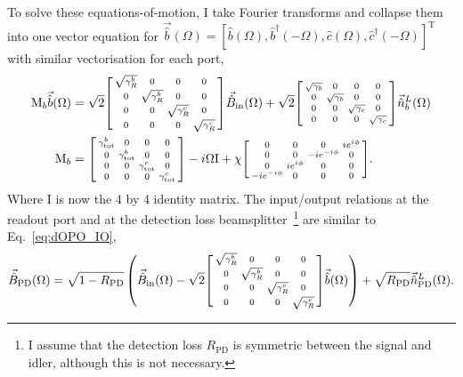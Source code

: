 To solve these equations-of-motion, I take Fourier transforms and collapse them into one vector equation for $\vec{\hat b}(\Omega)=[\hat b(\Omega), \hat b^\dag(-\Omega), \hat c(\Omega), \hat c^\dag(-\Omega)]^\text{T}$ with similar vectorisation for each port,
\begin{align}
\text{M}_b\vec{\hat b}(\Omega)&=\sqrt{2}\begin{bsmallmatrix}
\sqrt{\gamma^b_R} & 0 & 0 & 0 \\
0 & \sqrt{\gamma^b_R} & 0 & 0 \\
0 & 0 & \sqrt{\gamma^c_R} & 0 \\
0 & 0 & 0 & \sqrt{\gamma^c_R}
\end{bsmallmatrix}\vec{\hat B}_\mathrm{in}(\Omega) + \sqrt{2}\begin{bsmallmatrix}
\sqrt{\gamma_b} & 0 & 0 & 0 \\
0 & \sqrt{\gamma_b} & 0 & 0 \\
0 & 0 & \sqrt{\gamma_c} & 0 \\
0 & 0 & 0 & \sqrt{\gamma_c}
\end{bsmallmatrix}\vec{\hat n}^L_b(\Omega)\\
\text{M}_b&=\begin{bsmallmatrix}
\gamma^b_\mathrm{tot} & 0 & 0 & 0 \\
0 & \gamma^b_\mathrm{tot} & 0 & 0 \\
0 & 0 & \gamma^c_\mathrm{tot} & 0 \\
0 & 0 & 0 & \gamma^c_\mathrm{tot} 
\end{bsmallmatrix}-i\Omega \text{I}+\chi \begin{bsmallmatrix}
0 & 0 & 0 & i e^{i\phi} \\
0 & 0 & -i e^{-i\phi} & 0 \\
0 & i e^{i\phi} & 0 & 0 \\
-i e^{-i\phi} & 0 & 0 & 0
\end{bsmallmatrix}.
\end{align}
Where $\text{I}$ is now the 4 by 4 identity matrix. The input/output relations at the readout port and at the detection loss beamsplitter~\footnote{I assume that the detection loss $R_\text{PD}$ is symmetric between the signal and idler, although this is not necessary.} are similar to Eq.~\ref{eq:dOPO_IO},
\begin{align}
\label{eq:nOPO_IO_relations}
\vec{\hat{B}}_\mathrm{PD}(\Omega)=\sqrt{1-R_\text{PD}}\left(\vec{\hat{B}}_\mathrm{in}(\Omega)-\sqrt{2}\begin{bsmallmatrix}
\sqrt{\gamma^b_R} & 0 & 0 & 0 \\
0 & \sqrt{\gamma^b_R} & 0 & 0 \\
0 & 0 & \sqrt{\gamma^c_R} & 0 \\
0 & 0 & 0 & \sqrt{\gamma^c_R}
\end{bsmallmatrix}\vec{\hat b}(\Omega)\right)+\sqrt{R_\text{PD}}\vec{\hat n}^L_\text{PD}(\Omega).
\end{align}
